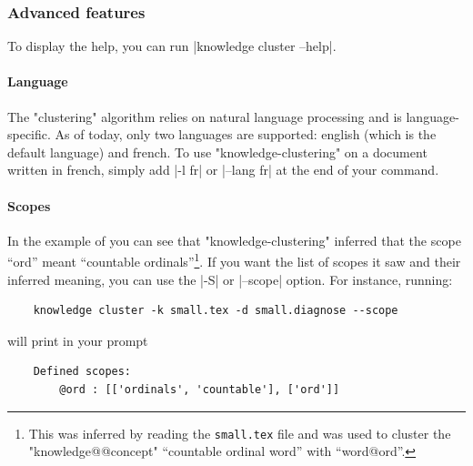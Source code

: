 \documentclass{article}
\begin{document}
\subsubsection{Advanced features}

To display the help, you can run \spverb|knowledge cluster --help|.

\paragraph{Language} The "clustering" algorithm relies on natural language 
processing and is language-specific. As of today, only two languages
are supported: english (which is the default language) and french.
To use "knowledge-clustering" on a document written in french,
simply add \spverb|-l fr| or \spverb|--lang fr| at the end of your command.


\paragraph{Scopes} In the example of
you can see that "knowledge-cluste\-ring" inferred that the
scope ``ord'' meant ``countable ordinals''\footnote{This was inferred
by reading the \texttt{small.tex} file and was used to cluster
the "knowledge@@concept" ``countable ordinal word'' with ``word@ord''.}.
If you want the list of scopes it saw
and their inferred meaning, you can use the \spverb|-S| or \spverb|--scope| 
option. 
For instance, running:
\begin{verbatim}
    knowledge cluster -k small.tex -d small.diagnose --scope
\end{verbatim}
will print in your prompt
\begin{verbatim}
    Defined scopes:
	    @ord : [['ordinals', 'countable'], ['ord']]
\end{verbatim}
\end{document}
